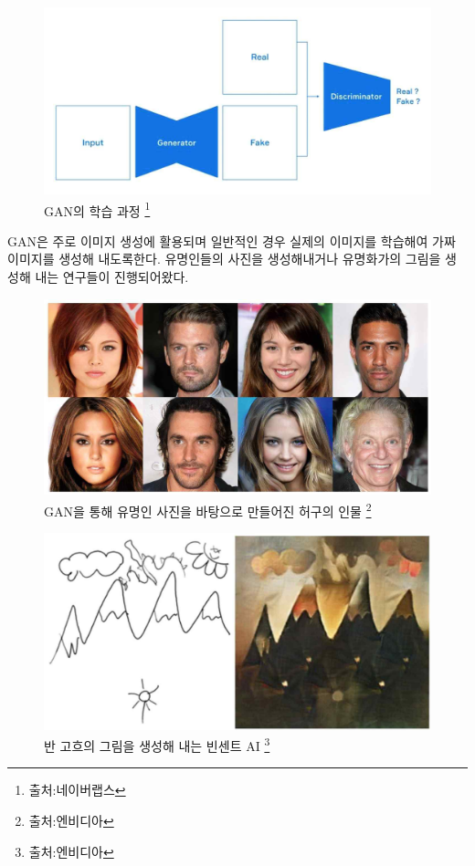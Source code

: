 \documentclass[chapter,oneside]{oblivoir}
\begin{document}
\begin{figure}[h!]
  \centering
    \includegraphics{pic/chp5/img858}
  \caption{GAN의 학습 과정 \protect\footnote{출처:네이버랩스}}
\end{figure}



GAN은 주로 이미지 생성에 활용되며 일반적인 경우 실제의 이미지를 학습해여 가짜 이미지를 생성해 내도록한다. 유명인들의 사진을 생성해내거나 유명화가의 그림을 생성해 내는 연구들이 진행되어왔다.

\begin{figure}[h!]
  \centering
    \includegraphics{pic/chp5/img866}
  \caption{GAN을 통해 유명인 사진을 바탕으로 만들어진 허구의 인물 \protect\footnote{출처:엔비디아}}
\end{figure}


\begin{figure}[h!]
  \centering
    \includegraphics{pic/chp5/img868}
  \caption{반 고흐의 그림을 생성해 내는 빈센트 AI \protect\footnote{출처:엔비디아}}
\end{figure}
\end{document}
